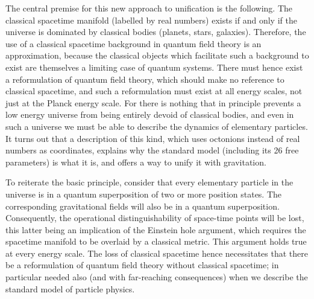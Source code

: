 \documentclass[a4paper]{jpconf}
\begin{document}
The central premise for this new approach to unification is the following. The classical spacetime manifold (labelled by real numbers) exists if and only if the universe is dominated by classical bodies (planets, stars, galaxies). Therefore, the use of a classical spacetime background in quantum field theory is an approximation, because the classical objects which facilitate such a background to exist are themselves a limiting case of quantum systems. There must hence exist a reformulation of quantum field theory, which should make no reference to classical spacetime, and such a reformulation must exist at all energy scales, not just at the Planck energy scale. For there is nothing that in principle prevents a low energy universe from being entirely devoid of classical bodies, and even in such a universe we must be able to describe the dynamics of elementary particles. It turns out that a description of this kind, which uses octonions instead of real numbers as coordinates, explains why the standard model (including its 26 free parameters) is what it is, and offers a way to unify it with gravitation.

To reiterate the basic principle, consider that every elementary particle in the universe is in a quantum superposition of two or more position states. The corresponding gravitational fields will also be in a quantum superposition. Consequently, the operational distinguishability of space-time points will be lost, this latter being an implication of the Einstein hole argument, which requires the spacetime manifold to be overlaid by a classical metric. This argument holds true at every energy scale. The loss of classical spacetime hence necessitates that there be a reformulation of quantum field theory without classical spacetime; in particular needed also (and with far-reaching consequences) when we describe  the standard model of particle physics.
\end{document}
